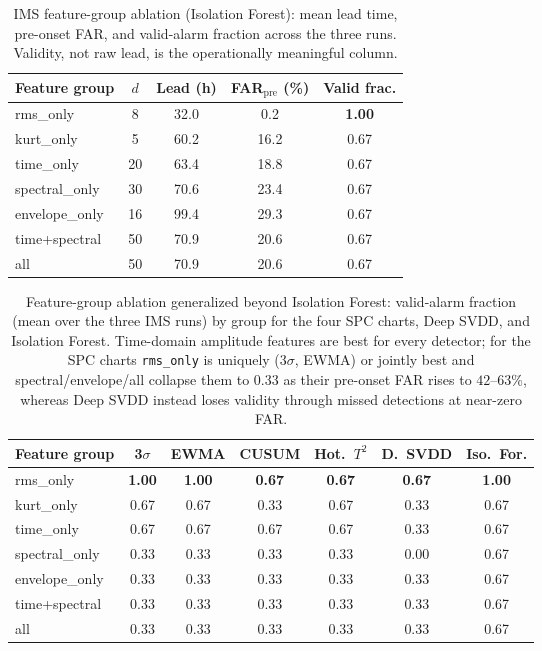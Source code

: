 \documentclass[journal]{IEEEtran}
\begin{document}
\begin{table}[t]
\caption{IMS feature-group ablation (Isolation Forest): mean lead time,
pre-onset FAR, and valid-alarm fraction across the three runs. Validity, not raw
lead, is the operationally meaningful column.}
\label{tab:ablation}
\centering
\footnotesize
\begin{tabular}{@{}lcccc@{}}
\toprule
Feature group & $d$ & Lead (h) & FAR$_{\mathrm{pre}}$ (\%) & Valid frac. \\
\midrule
rms\_only        & \phantom{0}8 & 32.0 & \phantom{0}0.2 & \textbf{1.00} \\
kurt\_only       & \phantom{0}5 & 60.2 & 16.2 & 0.67 \\
time\_only       & 20 & 63.4 & 18.8 & 0.67 \\
spectral\_only   & 30 & 70.6 & 23.4 & 0.67 \\
envelope\_only   & 16 & 99.4 & 29.3 & 0.67 \\
time+spectral    & 50 & 70.9 & 20.6 & 0.67 \\
all              & 50 & 70.9 & 20.6 & 0.67 \\
\bottomrule
\end{tabular}
\end{table}

\begin{table}[t]
\caption{Feature-group ablation generalized beyond Isolation Forest: valid-alarm
fraction (mean over the three IMS runs) by group for the four SPC charts, Deep
SVDD, and Isolation Forest. Time-domain amplitude features are best for every
detector; for the SPC charts \texttt{rms\_only} is uniquely (3$\sigma$, EWMA) or
jointly best and spectral/envelope/all collapse them to $0.33$ as their pre-onset
FAR rises to $42$--$63\%$, whereas Deep SVDD instead loses validity through missed
detections at near-zero FAR.}
\label{tab:ablation_spc}
\centering
\footnotesize
\setlength{\tabcolsep}{4pt}
\begin{tabular}{@{}lcccccc@{}}
\toprule
Feature group & 3$\sigma$ & EWMA & CUSUM & Hot.\ $T^2$ & D.\ SVDD & Iso.\ For. \\
\midrule
rms\_only      & \textbf{1.00} & \textbf{1.00} & \textbf{0.67} & \textbf{0.67} & \textbf{0.67} & \textbf{1.00} \\
kurt\_only     & 0.67 & 0.67 & 0.33 & 0.67 & 0.33 & 0.67 \\
time\_only     & 0.67 & 0.67 & 0.67 & 0.67 & 0.33 & 0.67 \\
spectral\_only & 0.33 & 0.33 & 0.33 & 0.33 & 0.00 & 0.67 \\
envelope\_only & 0.33 & 0.33 & 0.33 & 0.33 & 0.33 & 0.67 \\
time+spectral  & 0.33 & 0.33 & 0.33 & 0.33 & 0.33 & 0.67 \\
all            & 0.33 & 0.33 & 0.33 & 0.33 & 0.33 & 0.67 \\
\bottomrule
\end{tabular}
\end{table}
\end{document}

